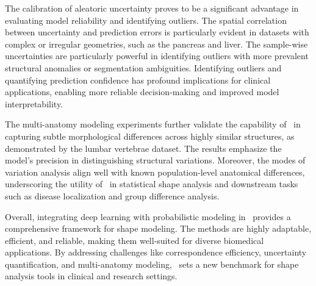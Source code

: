 The calibration of aleatoric uncertainty proves to be a significant advantage in evaluating model reliability and identifying outliers. The spatial correlation between uncertainty and prediction errors is particularly evident in datasets with complex or irregular geometries, such as the pancreas and liver. The sample-wise uncertainties are particularly powerful in identifying outliers with more prevalent structural anomalies or segmentation ambiguities. Identifying outliers and quantifying prediction confidence has profound implications for clinical applications, enabling more reliable decision-making and improved model interpretability.

The multi-anatomy modeling experiments further validate the capability of \model~in capturing subtle morphological differences across highly similar structures, as demonstrated by the lumbar vertebrae dataset. The results emphasize the model's precision in distinguishing structural variations. Moreover, the modes of variation analysis align well with known population-level anatomical differences, underscoring the utility of \model~in statistical shape analysis and downstream tasks such as disease localization and group difference analysis.

Overall, integrating deep learning with probabilistic modeling in \model~provides a comprehensive framework for shape modeling. The methods are highly adaptable, efficient, and reliable, making them well-suited for diverse biomedical applications. By addressing challenges like correspondence efficiency, uncertainty quantification, and multi-anatomy modeling, \model~sets a new benchmark for shape analysis tools in clinical and research settings. 